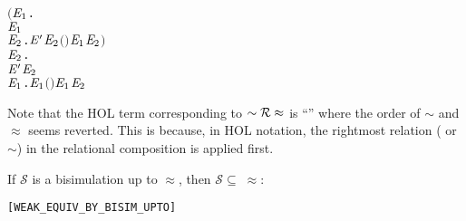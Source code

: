 \begin{definition}
\begin{alltt}
         \ensuremath{(}\HOLSymConst{\HOLTokenForall{}}\ensuremath{\HOLBoundVar{E}\sb{\mathrm{1}}}.
               \HOLTokenTransBegin\HOLSymConst{\ensuremath{\tau}}\HOLTokenTransEnd \ensuremath{\HOLBoundVar{E}\sb{\mathrm{1}}} \HOLSymConst{\HOLTokenImp{}}
              \HOLSymConst{\HOLTokenExists{}}\ensuremath{\HOLBoundVar{E}\sb{\mathrm{2}}}. \ensuremath{\HOLBoundVar{E}\sp{\prime}} \HOLSymConst{\HOLTokenEPS} \ensuremath{\HOLBoundVar{E}\sb{\mathrm{2}}} \HOLSymConst{\HOLTokenConj{}} \ensuremath{(} \HOLSymConst{\HOLTokenRCompose{}}  \HOLSymConst{\HOLTokenRCompose{}} \ensuremath{)} \ensuremath{\HOLBoundVar{E}\sb{\mathrm{1}}} \ensuremath{\HOLBoundVar{E}\sb{\mathrm{2}}}\ensuremath{)} \HOLSymConst{\HOLTokenConj{}}
         \HOLSymConst{\HOLTokenForall{}}\ensuremath{\HOLBoundVar{E}\sb{\mathrm{2}}}.
             \ensuremath{\HOLBoundVar{E}\sp{\prime}} \HOLTokenTransBegin\HOLSymConst{\ensuremath{\tau}}\HOLTokenTransEnd \ensuremath{\HOLBoundVar{E}\sb{\mathrm{2}}} \HOLSymConst{\HOLTokenImp{}}
             \HOLSymConst{\HOLTokenExists{}}\ensuremath{\HOLBoundVar{E}\sb{\mathrm{1}}}.  \HOLSymConst{\HOLTokenEPS} \ensuremath{\HOLBoundVar{E}\sb{\mathrm{1}}} \HOLSymConst{\HOLTokenConj{}} \ensuremath{(} \HOLSymConst{\HOLTokenRCompose{}}  \HOLSymConst{\HOLTokenRCompose{}} \ensuremath{)} \ensuremath{\HOLBoundVar{E}\sb{\mathrm{1}}} \ensuremath{\HOLBoundVar{E}\sb{\mathrm{2}}}
\end{alltt}
\end{definition}
Note that the HOL term corresponding to $\sim {\cal R} \approx$ is
``'' where the order of
$\sim$ and $\approx$ seems reverted. This is because, in HOL
notation, the rightmost relation ( or $\sim$) in the relational composition is
applied first.

\begin{theorem}
If $\mathcal{S}$ is a bisimulation up to $\approx$, then
$\mathcal{S} \subseteq\;\approx$:
\begin{alltt}
\HOLTokenTurnstile{}   \HOLSymConst{\HOLTokenConj{}}    \HOLSymConst{\HOLTokenImp{}}  \HOLSymConst{\HOLTokenWeakEQ} \hfill{[WEAK_EQUIV_BY_BISIM_UPTO]}
\end{alltt}
\end{theorem}


